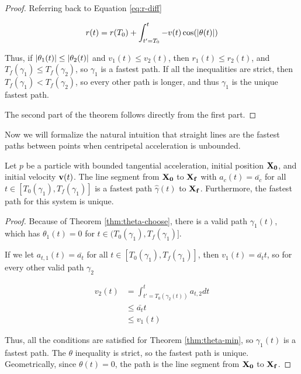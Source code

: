 \begin{proof}
  Referring back to Equation \ref{eq:r-diff}

  \[r(t) = r(T_0) + \int_{t' = T_0}^{t} - v(t) \cos(\abs{\theta(t)})\]

  Thus, if $\abs{\theta_1(t)} \le \abs{\theta_2(t)}$ and $v_1(t) \le v_2(t)$, then $r_1(t) \le r_2(t)$, and $T_f(\gamma_1) \le T_f(\gamma_2)$, so $\gamma_1$ is a fastest path. If all the inequalities are strict, then $T_f(\gamma_1) < T_f(\gamma_2)$, so every other path is longer, and thus $\gamma_1$ is the unique fastest path.

  The second part of the theorem follows directly from the first part.
\end{proof}

Now we will formalize the natural intuition that straight lines are the fastest paths between points when centripetal acceleration is unbounded.

\begin{theorem}\label{thm:line-proof}
  Let $p$ be a particle with bounded tangential acceleration, initial position $\mathbf{X_0}$, and initial velocity $\mathbf{v}(t)$. The line segment from $\mathbf{X_0}$ to $\mathbf{X_f}$ with $a_c(t) = \bar{a_c}$ for all $t \in [T_0(\gamma_1), T_f(\gamma_1)]$ is a fastest path $\hat{\gamma}(t)$ to $\mathbf{X_f}$. Furthermore, the fastest path for this system is unique.
\end{theorem}

\begin{proof}
  Because of Theorem \ref{thm:theta-choose}, there is a valid path $\gamma_1(t)$, which has $\theta_1(t) = 0$ for $t \in (T_0(\gamma_1), T_f(\gamma_1)]$.

  If we let $a_{t, 1}(t) = \bar{a_t}$ for all $t \in [T_0(\gamma_1), T_f(\gamma_1)]$, then $v_1(t) = \bar{a_t} t$, so for every other valid path $\gamma_2$

  \begin{align*}
    v_2(t)& = \int_{t'=T_0(\gamma_2(t))}^{t} a_{t, 2} dt\\
    & \le \bar{a_t} t\\
    &  \le v_1(t)
  \end{align*}

  Thus, all the conditions are satisfied for Theorem \ref{thm:theta-min}, so $\gamma_1(t)$ is a fastest path. The $\theta$ inequality is strict, so the fastest path is unique. Geometrically, since $\theta(t) = 0$, the path is the line segment from $\mathbf{X_0}$ to $\mathbf{X_f}$.
\end{proof}

